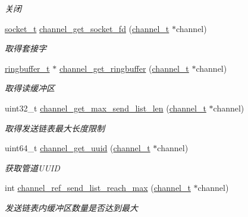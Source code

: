 \begin{DoxyCompactItemize}
\begin{DoxyCompactList}\small\item\em 关闭 \end{DoxyCompactList}\item 
\hyperlink{a00047_a0d9e0afbf02fb6ed6c5b1415dce51b05_a0d9e0afbf02fb6ed6c5b1415dce51b05}{socket\+\_\+t} \hyperlink{a00042_a950ec7a2a3c89032577fba60a59b1f91_a950ec7a2a3c89032577fba60a59b1f91}{channel\+\_\+get\+\_\+socket\+\_\+fd} (\hyperlink{a00047_a2effb3e20d0b7e5f6d5ac42118e0330b_a2effb3e20d0b7e5f6d5ac42118e0330b}{channel\+\_\+t} $\ast$channel)
\begin{DoxyCompactList}\small\item\em 取得套接字 \end{DoxyCompactList}\item 
\hyperlink{a00047_af929c5cf86b6a0f64dde407dfe60482e_af929c5cf86b6a0f64dde407dfe60482e}{ringbuffer\+\_\+t} $\ast$ \hyperlink{a00042_aa7ab12f174b1d8384b1c3ef3b15bd83b_aa7ab12f174b1d8384b1c3ef3b15bd83b}{channel\+\_\+get\+\_\+ringbuffer} (\hyperlink{a00047_a2effb3e20d0b7e5f6d5ac42118e0330b_a2effb3e20d0b7e5f6d5ac42118e0330b}{channel\+\_\+t} $\ast$channel)
\begin{DoxyCompactList}\small\item\em 取得读缓冲区 \end{DoxyCompactList}\item 
uint32\+\_\+t \hyperlink{a00042_a855f29f5cb8f5c0420af7a377bd2f531_a855f29f5cb8f5c0420af7a377bd2f531}{channel\+\_\+get\+\_\+max\+\_\+send\+\_\+list\+\_\+len} (\hyperlink{a00047_a2effb3e20d0b7e5f6d5ac42118e0330b_a2effb3e20d0b7e5f6d5ac42118e0330b}{channel\+\_\+t} $\ast$channel)
\begin{DoxyCompactList}\small\item\em 取得发送链表最大长度限制 \end{DoxyCompactList}\item 
uint64\+\_\+t \hyperlink{a00042_af23ca0f2b9462f153a4236d787f9f25a_af23ca0f2b9462f153a4236d787f9f25a}{channel\+\_\+get\+\_\+uuid} (\hyperlink{a00047_a2effb3e20d0b7e5f6d5ac42118e0330b_a2effb3e20d0b7e5f6d5ac42118e0330b}{channel\+\_\+t} $\ast$channel)
\begin{DoxyCompactList}\small\item\em 获取管道\+U\+U\+I\+D \end{DoxyCompactList}\item 
int \hyperlink{a00042_a755d848b2b5d58cf883ef1b66950274c_a755d848b2b5d58cf883ef1b66950274c}{channel\+\_\+ref\+\_\+send\+\_\+list\+\_\+reach\+\_\+max} (\hyperlink{a00047_a2effb3e20d0b7e5f6d5ac42118e0330b_a2effb3e20d0b7e5f6d5ac42118e0330b}{channel\+\_\+t} $\ast$channel)
\begin{DoxyCompactList}\small\item\em 发送链表内缓冲区数量是否达到最大 \end{DoxyCompactList}\end{DoxyCompactItemize}


